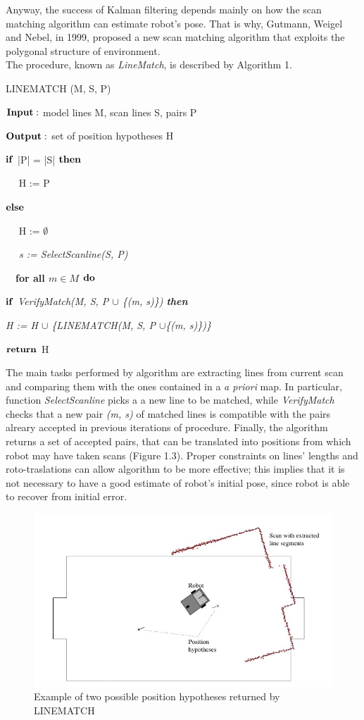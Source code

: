 \documentclass[a4paper, onecolumn]{report}
\begin{document}
Anyway, the success of Kalman filtering depends mainly on how the scan matching algorithm can estimate robot's pose. That is why, Gutmann, Weigel and Nebel, in 1999, proposed a new scan matching algorithm that exploits the polygonal structure of environment. \\
The procedure, known as \emph{LineMatch}, is described by Algorithm 1.
\begin{algorithm}
	\caption{\mbox{LINEMATCH} (M, S, P)}
	\begin{algorithmic}[1]
		\item{$\bf{Input:} $ model lines M, scan lines S, pairs P}
		\item{$\bf{Output:} $ set of position hypotheses H}
		\item{$\bf{if}$ |P| = |S| $\bf{then}$}
		\item{$\quad$ H := P}
		\item{$\bf{else}$}
		\item{$\quad$ H := $\emptyset$}
		\item{\emph{$\quad$ s := SelectScanline(S, P)}}
		\item{$\quad$\bf{for all} $m \in M$ $\bf{do}$}
		\item{\qquad $\bf{if}$ \emph{VerifyMatch(M, S, P $\cup$ \{(m, s)\}) \bf{then}}}
		\item{\quad \qquad \emph{H := H $\cup$ \{\mbox{LINEMATCH}(M, S, P   $\cup$\{(m, s)\})\}}}
		\item{$\bf{return}$ H}	
	\end{algorithmic}
\end{algorithm}
The main tasks performed by algorithm are extracting lines from current scan and comparing them with the ones contained in a \emph{a priori} map. In particular, function \emph{SelectScanline} picks a a new line to be matched, while \emph{VerifyMatch} checks that a new pair \emph{(m, s)} of matched lines is compatible with the pairs alreary accepted in previous iterations of procedure. Finally, the algorithm returns a set of accepted pairs, that can be translated into positions from which robot may have taken scans (Figure 1.3). Proper constraints on lines' lengths and roto-traslations can allow algorithm to be more effective; this implies that it is not necessary to have a good estimate of robot's initial pose, since robot is able to recover from initial error.  
\begin{figure}[htbp]
\centering
\centering\setlength{\captionmargin}{0pt}%
\includegraphics[width=.90\textwidth]{images/robocup_robot_positions.jpeg}
\caption{Example of two possible position hypotheses returned by LINEMATCH}
\end{figure}
\end{document}
